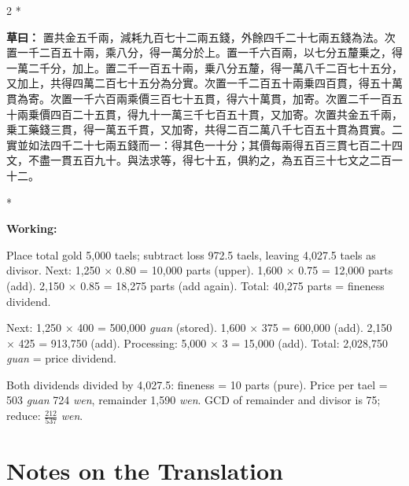 \documentclass[11pt,a4paper]{article}
\newcommand{\CnWorking}[1]{\par\noindent\textbf{草曰：}#1\par\vspace{0.5ex}}
\newcommand{\EnWorking}{\par\noindent\textbf{Working:}\par\vspace{0.5ex}}
\newcommand{\switchCn}{\switchcolumn[0]*}
\newcommand{\switchEn}{\switchcolumn[1]*}
\begin{document}
\begin{paracol}{2}
\switchCn

\CnWorking{%
置共金五千兩，減耗九百七十二兩五錢，外餘四千二十七兩五錢為法。次置一千二百五十兩，乘八分，得一萬分於上。置一千六百兩，以七分五釐乗之，得一萬二千分，加上。置二千一百五十兩，乗八分五釐，得一萬八千二百七十五分，又加上，共得四萬二百七十五分為分實。次置一千二百五十兩乗四百貫，得五十萬貫為寄。次置一千六百兩乘價三百七十五貫，得六十萬貫，加寄。次置二千一百五十兩乗價四百二十五貫，得九十一萬三千七百五十貫，又加寄。次置共金五千兩，乗工藥錢三貫，得一萬五千貫，又加寄，共得二百二萬八千七百五十貫為貫實。二實並如法四千二十七兩五錢而一：得其色一十分；其價每兩得五百三貫七百二十四文，不盡一貫五百九十。與法求等，得七十五，俱約之，為五百三十七文之二百一十二。
}

\switchEn

\EnWorking
Place total gold 5,000 taels; subtract loss 972.5 taels, leaving 4,027.5 taels as divisor. Next: 1,250 $\times$ 0.80 = 10,000 parts (upper). 1,600 $\times$ 0.75 = 12,000 parts (add). 2,150 $\times$ 0.85 = 18,275 parts (add again). Total: 40,275 parts = fineness dividend.

Next: 1,250 $\times$ 400 = 500,000 \textit{guan} (stored). 1,600 $\times$ 375 = 600,000 (add). 2,150 $\times$ 425 = 913,750 (add). Processing: 5,000 $\times$ 3 = 15,000 (add). Total: 2,028,750 \textit{guan} = price dividend.

Both dividends divided by 4,027.5: fineness = 10 parts (pure). Price per tael = 503 \textit{guan} 724 \textit{wen}, remainder 1,590 \textit{wen}. GCD of remainder and divisor is 75; reduce: $\frac{212}{537}$ \textit{wen}.

\end{paracol}

\newpage

\section*{\color{titlecolor}Notes on the Translation}
\end{document}
